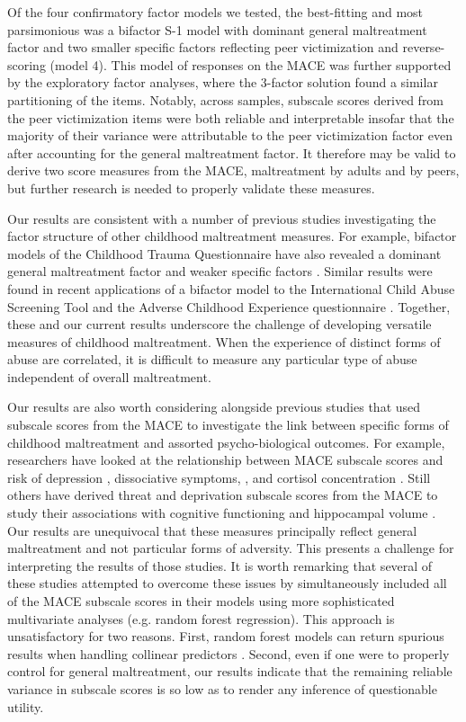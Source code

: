 \documentclass[letterpaper,man,natbib,floatsintext,longtable]{apa6}
\begin{document}
Of the four confirmatory factor models we tested, the best-fitting and most parsimonious was a bifactor S-1 model with dominant general maltreatment factor and two smaller specific factors reflecting peer victimization and reverse-scoring (model 4). This model of responses on the MACE was further supported by the exploratory factor analyses, where the 3-factor solution found a similar partitioning of the items. Notably, across samples, subscale scores derived from the peer victimization items were both reliable and interpretable insofar that the majority of their variance were attributable to the peer victimization factor even after accounting for the general maltreatment factor. It therefore may be valid to derive two score measures from the MACE, maltreatment by adults and by peers, but further research is needed to properly validate these measures.

Our results are consistent with a number of previous studies investigating the factor structure of other childhood maltreatment measures. For example, bifactor models of the Childhood Trauma Questionnaire have also revealed a dominant general maltreatment factor and weaker specific factors \citep{spinhoven2014childhood, hollerbach2018main, stagaki2022mediating}. Similar results were found in recent applications of a bifactor model to the International Child Abuse Screening Tool \citep{meinck2021factor} and the Adverse Childhood Experience questionnaire \citep{dobson2021latent}. Together, these and our current results underscore the challenge of developing versatile measures of childhood maltreatment. When the experience of distinct forms of abuse are correlated, it is difficult to measure any particular type of abuse independent of overall maltreatment.  
 
Our results are also worth considering alongside previous studies that used subscale scores from the MACE to investigate the link between specific forms of childhood maltreatment and assorted psycho-biological outcomes. For example, researchers have looked at the relationship between MACE subscale scores and risk of depression \citep{gerke2018childhood}, dissociative symptoms, \citep{schalinski2015type}, and cortisol concentration \citep{schalinski2019early}. Still others have derived threat and deprivation subscale scores from the MACE to study their associations with cognitive functioning \citep{schalinski2018defining} and hippocampal volume \citep{teicher2018differential}. Our results are unequivocal that these measures principally reflect general maltreatment and not particular forms of adversity. This presents a challenge for interpreting the results of those studies. It is worth remarking that several of these studies attempted to overcome these issues by simultaneously included all of the MACE subscale scores in their models using more sophisticated multivariate analyses (e.g. random forest regression). This approach is unsatisfactory for two reasons. First, random forest models can return spurious results when handling collinear predictors \citep{gregorutti2017correlation}. Second, even if one were to properly control for general maltreatment, our results indicate that the remaining reliable variance in subscale scores is so low as to render any inference of questionable utility.
\end{document}
